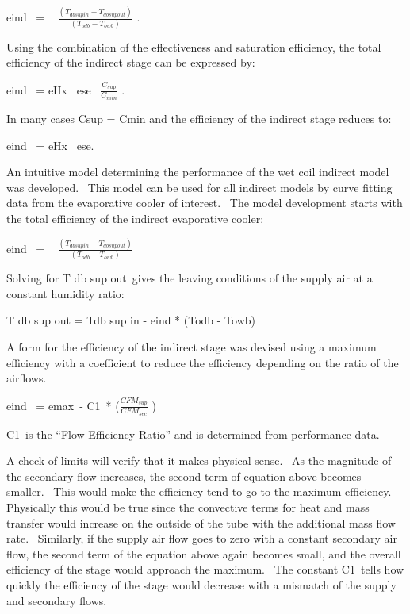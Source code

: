eind~ = ~ \(\frac{{({T_{dbsupin}} - {T_{dbsupout}})}}{{({T_{odb}} - {T_{owb}})}}\) .

Using the combination of the effectiveness and saturation efficiency, the total efficiency of the indirect stage can be expressed by:

eind~ = eHx~ ese~ \(\frac{{{C_{sup}}}}{{{C_{min}}}}\) .

In many cases Csup = Cmin and the efficiency of the indirect stage reduces to:

eind~ = eHx~ ese.

An intuitive model determining the performance of the wet coil indirect model was developed.~ This model can be used for all indirect models by curve fitting data from the evaporative cooler of interest.~ The model development starts with the total efficiency of the indirect evaporative cooler:

eind~ = ~ \(\frac{{({T_{dbsupin}} - {T_{dbsupout}})}}{{({T_{odb}} - {T_{owb}})}}\)

Solving for T db sup out~gives the leaving conditions of the supply air at a constant humidity ratio:

T db sup out = Tdb sup in - eind * (Todb - Towb)

A form for the efficiency of the indirect stage was devised using a maximum efficiency with a coefficient to reduce the efficiency depending on the ratio of the airflows.

eind~ = emax~- C1~* (\(\frac{{CF{M_{sup}}}}{{CF{M_{sec}}}}\) )

C1~is the ``Flow Efficiency Ratio'' and is determined from performance data.

A check of limits will verify that it makes physical sense.~ As the magnitude of the secondary flow increases, the second term of equation above becomes smaller.~ This would make the efficiency tend to go to the maximum efficiency.~ Physically this would be true since the convective terms for heat and mass transfer would increase on the outside of the tube with the additional mass flow rate.~ Similarly, if the supply air flow goes to zero with a constant secondary air flow, the second term of the equation above again becomes small, and the overall efficiency of the stage would approach the maximum.~ The constant C1~tells how quickly the efficiency of the stage would decrease with a mismatch of the supply and secondary flows.

